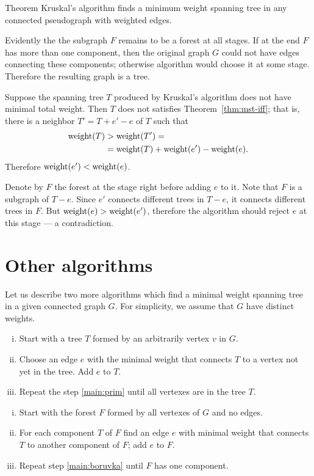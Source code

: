 \begin{thm}{Theorem}\label{thm:kruskal}
Kruskal’s algorithm finds a minimum weight spanning tree in any connected pseudograph with weighted edges.
\end{thm}

Evidently the the subgraph $F$ remains to be a forest at all stages.
If at the end $F$ has more than one component, then the original graph $G$ could not have edges connecting these components;
otherwise algorithm would choose it at some stage.
Therefore the resulting graph is a tree.

Suppose the spanning tree $T$ produced by Kruskal’s algorithm does not have minimal total weight.
Then $T$ does not satisfies Theorem~\ref{thm:mst-iff};
that is, there is a neighbor $T'=T+e'-e$ of $T$ such that 
\begin{align*}
\mathop{\rm weight}\nolimits(T)&>\mathop{\rm weight}\nolimits(T')=
\\
&=\mathop{\rm weight}\nolimits(T)+\mathop{\rm weight}\nolimits(e')-\mathop{\rm weight}\nolimits(e).
\end{align*}
Therefore $\mathop{\rm weight}\nolimits(e')<\mathop{\rm weight}\nolimits(e)$.

Denote by $F$ the forest at the stage right before adding $e$ to it.
Note that $F$ is a subgraph of $T-e$.
Since $e'$ connects different trees in $T-e$,
it connects different trees in $F$.
But $\mathop{\rm weight}\nolimits(e)>\mathop{\rm weight}\nolimits(e')$, therefore the algorithm should reject $e$ at this stage --- a contradiction.
\qeds

\section*{Other algorithms}

Let us describe two more algorithms which find  a minimal weight spanning tree in a given connected graph $G$.
For simplicity, we assume that $G$ have distinct weights.

\begin{enumerate}[(i)]
\item Start with a tree $T$ formed by an arbitrarily vertex $v$ in $G$.
\item\label{main:prim} Choose an edge $e$ with the minimal weight that connects $T$ to a vertex not yet in the tree.
Add $e$ to $T$.
\item Repeat the step \ref{main:prim} until all vertexes are in the tree $T$.
\end{enumerate}

\begin{enumerate}[(i)]
\item Start with the forest $F$ formed by all vertexes of $G$ and no edges.
\item\label{main:boruvka} For each component $T$ of $F$ find an edge $e$ with minimal weight that connects $T$ to another component of $F$; add $e$ to $F$.
\item Repeat step \ref{main:boruvka} until $F$ has one component. 
\end{enumerate}


